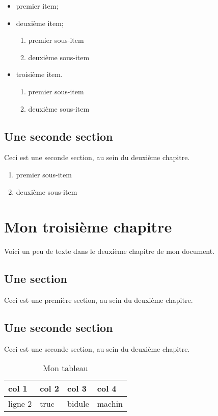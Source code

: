 \documentclass[12pt]{report}			%
\begin{document}
	\begin{itemize}[label=$\square$,leftmargin=* ,parsep=0cm,itemsep=0cm,topsep=0cm]	%
		\item premier item;
		\item deuxième item;
		
		\begin{enumerate}[label=\Alph*)]
			\item premier sous-item
			\item deuxième sous-item
		\end{enumerate}
		\item troisième item.
		\begin{enumerate}[label=\arabic*),resume]
			\item premier sous-item
			\item deuxième sous-item
		\end{enumerate}
	\end{itemize}
	\section{Une seconde section}
	Ceci est une seconde section, au sein du deuxième chapitre.
	\begin{enumerate}[label=\roman*)]
			\item premier sous-item
			\item deuxième sous-item
		\end{enumerate}
	
	\chapter{Mon troisième chapitre}
	Voici un peu de texte dans le deuxième chapitre de mon document.
	\section{Une section}
	Ceci est une première section, au sein du deuxième chapitre.
	\section{Une seconde section}
	Ceci est une seconde section, au sein du deuxième chapitre.
	
	\begin{table}
\centering
\begin{tabular}{|R{2cm}||C{1cm}|L{1.5cm}|L{1.5cm}|}
\hline col 1 & col 2 &  col 3 &  col 4  \\
\hline  ligne 2 & truc & bidule & machin  \\
\hline 
\end{tabular}
\caption{Mon tableau}
\label{tab1}
\end{table}
\end{document}
